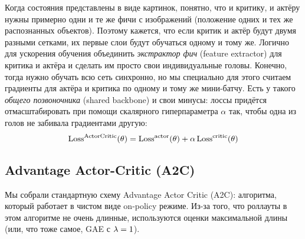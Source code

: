 \begin{remark}
Когда состояния представлены в виде картинок, понятно, что и критику, и актёру нужны примерно одни и те же фичи с изображений (положение одних и тех же распознанных объектов). Поэтому кажется, что если критик и актёр будут двумя разными сетками, их первые слои будут обучаться одному и тому же. Логично для ускорения обучения объединить \emph{экстрактор фич} (feature extractor) для критика и актёра и сделать им просто свои индивидуальные головы. Конечно, тогда нужно обучать всю сеть синхронно, но мы специально для этого считаем градиенты для актёра и критика по одному и тому же мини-батчу. Есть у такого \emph{общего позвоночника} (shared backbone) и свои минусы: лоссы придётся отмасштабировать при помощи скалярного гиперпараметра $\alpha$ так, чтобы одна из голов не забивала градиентами другую:
$$\operatorname{Loss}^{\mathrm{ActorCritic}}(\theta) = \operatorname{Loss}^{\mathrm{actor}}(\theta) + \alpha \operatorname{Loss}^{\mathrm{critic}}(\theta)$$
\end{remark}

\subsection{Advantage Actor-Critic (A2C)}

Мы собрали стандартную схему Advantage Actor Critic (A2C): алгоритма, который работает в чистом виде on-policy режиме. Из-за того, что роллауты в этом алгоритме не очень длинные, используются оценки максимальной длины (или, что тоже самое, GAE с $\lambda \HM= 1$). 

